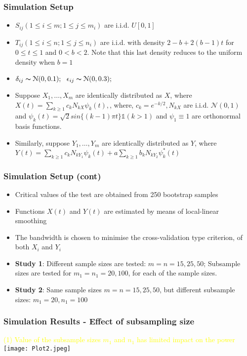 \documentclass[10pt,dvipsnames,table]{beamer}
\newcommand{\Ind}{\mathds{1}}
\begin{document}
\begin{frame}
\frametitle{Simulation Setup}
\begin{itemize}
\item
$S_{ij} (1 \leq i \leq m; 1 \leq j \leq m_i)$ are i.i.d. $U[0, 1]$
\item
$T_{ij} (1 \leq i \leq n; 1 \leq j \leq n_i)$ are i.i.d. with density $2 − b + 2(b − 1)t$ for $0 \leq t \leq 1$ and $0 < b < 2$. Note that this last density reduces to the uniform
density when $b = 1$
\item
$\delta_{ij} \thicksim \mathcal{N}(0, 0.1); \ \ \epsilon_{ij} \thicksim \mathcal{N}(0, 0.3);$
\item
Suppose $X_1, \dots,X_m$ are identically distributed as $X$, where $X(t) = \sum_{k \geq 1} c_k N_{kX} \psi_k(t),$, where, $c_k = e^{-k/2}, N_{kX}$ are i.i.d. $\mathcal{N}(0,1)$ and $\psi _k(t) = \sqrt{2} sin\{(k −1)\pi t\}\Ind(k > 1)$ and $\psi _1 \equiv 1$ are orthonormal basis functions.
\item
Similarly, suppose $Y_1, \dots,Y_m$ are identically distributed as $Y$, where $Y(t) = \sum_{k \geq 1} c_k N_{kY_1}\psi_k(t) + a\sum_{k \geq 1} b_k N_{kY_2}\psi ^* _k(t)$
\end{itemize}
\end{frame}

\begin{frame}
\frametitle{Simulation Setup (cont)}
\begin{itemize}
\item
Critical values of the test are obtained from 250 bootstrap samples
\item
Functions $X(t)$ and $Y(t)$ are estimated by means of local-linear smoothing
\item
The bandwidth is chosen to minimise the cross-validation type criterion, of both $X_i$ and $Y_i$
\item 
{\bf{Study 1}}: Different sample sizes are tested: $m = n = 15, 25, 50$; Subsample sizes are tested for $m_1 = n_1 = 20, 100$, for each of the sample sizes. 
\item 
{\bf{Study 2}}: Same sample sizes $m = n = 15, 25, 50$, but different subsample sizes: $m_1 = 20, n_1 = 100$
\end{itemize}
\end{frame}

\begin{frame}
\frametitle{Simulation Results - Effect of subsampling size}
\textcolor{yellow}{(1) Value of the subsample sizes $m_1$ and $n_1$ has limited impact on the power}\\ 
\pause
\texttt{[image: Plot2.jpeg]}
\end{frame}
\end{document}
